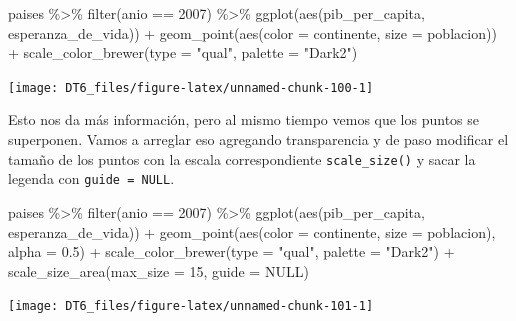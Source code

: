 \documentclass[
  openany]{book}
\newenvironment{Shaded}{\begin{snugshade}}{\end{snugshade}}
\newcommand{\AttributeTok}[1]{\textcolor[rgb]{0.77,0.63,0.00}{#1}}
\newcommand{\ConstantTok}[1]{\textcolor[rgb]{0.00,0.00,0.00}{#1}}
\newcommand{\DecValTok}[1]{\textcolor[rgb]{0.00,0.00,0.81}{#1}}
\newcommand{\FloatTok}[1]{\textcolor[rgb]{0.00,0.00,0.81}{#1}}
\newcommand{\FunctionTok}[1]{\textcolor[rgb]{0.00,0.00,0.00}{#1}}
\newcommand{\NormalTok}[1]{#1}
\newcommand{\SpecialCharTok}[1]{\textcolor[rgb]{0.00,0.00,0.00}{#1}}
\newcommand{\StringTok}[1]{\textcolor[rgb]{0.31,0.60,0.02}{#1}}
\begin{document}
\begin{Shaded}
\begin{Highlighting}[]
\NormalTok{paises }\SpecialCharTok{\%\textgreater{}\%} 
  \FunctionTok{filter}\NormalTok{(anio }\SpecialCharTok{==} \DecValTok{2007}\NormalTok{) }\SpecialCharTok{\%\textgreater{}\%} 
  \FunctionTok{ggplot}\NormalTok{(}\FunctionTok{aes}\NormalTok{(pib\_per\_capita, esperanza\_de\_vida)) }\SpecialCharTok{+}
  \FunctionTok{geom\_point}\NormalTok{(}\FunctionTok{aes}\NormalTok{(}\AttributeTok{color =}\NormalTok{ continente, }\AttributeTok{size =}\NormalTok{ poblacion)) }\SpecialCharTok{+}
  \FunctionTok{scale\_color\_brewer}\NormalTok{(}\AttributeTok{type =} \StringTok{"qual"}\NormalTok{, }\AttributeTok{palette =} \StringTok{"Dark2"}\NormalTok{)}
\end{Highlighting}
\end{Shaded}

\begin{center}\texttt{[image: DT6\_files/figure-latex/unnamed-chunk-100-1]} \end{center}

Esto nos da más información, pero al mismo tiempo vemos que los puntos se superponen.
Vamos a arreglar eso agregando transparencia y de paso modificar el tamaño de los puntos con la escala correspondiente \texttt{scale\_size()} y sacar la legenda con \texttt{guide\ =\ NULL}.

\begin{Shaded}
\begin{Highlighting}[]
\NormalTok{paises }\SpecialCharTok{\%\textgreater{}\%} 
  \FunctionTok{filter}\NormalTok{(anio }\SpecialCharTok{==} \DecValTok{2007}\NormalTok{) }\SpecialCharTok{\%\textgreater{}\%} 
  \FunctionTok{ggplot}\NormalTok{(}\FunctionTok{aes}\NormalTok{(pib\_per\_capita, esperanza\_de\_vida)) }\SpecialCharTok{+}
  \FunctionTok{geom\_point}\NormalTok{(}\FunctionTok{aes}\NormalTok{(}\AttributeTok{color =}\NormalTok{ continente, }\AttributeTok{size =}\NormalTok{ poblacion), }\AttributeTok{alpha =} \FloatTok{0.5}\NormalTok{) }\SpecialCharTok{+}
  \FunctionTok{scale\_color\_brewer}\NormalTok{(}\AttributeTok{type =} \StringTok{"qual"}\NormalTok{, }\AttributeTok{palette =} \StringTok{"Dark2"}\NormalTok{) }\SpecialCharTok{+}
  \FunctionTok{scale\_size\_area}\NormalTok{(}\AttributeTok{max\_size =} \DecValTok{15}\NormalTok{, }\AttributeTok{guide =} \ConstantTok{NULL}\NormalTok{)}
\end{Highlighting}
\end{Shaded}

\begin{center}\texttt{[image: DT6\_files/figure-latex/unnamed-chunk-101-1]} \end{center}
\end{document}
